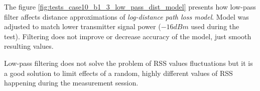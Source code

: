 \documentclass[../main.tex]{subfiles}
\begin{document}
The figure \ref{fig:tests_case10_b1_3_low_pass_dist_model} presents how low-pass filter affects distance approximations of \textit{log-distance path loss model}. Model was adjusted to match lower transmitter signal power ($-16dBm$ used during the test). Filtering does not improve or decrease accuracy of the model, just smooth resulting values.

Low-pass filtering does not solve the problem of RSS values fluctuations but it is a good solution to limit effects of a random, highly different values of RSS happening during the measurement session.

\end{document}
